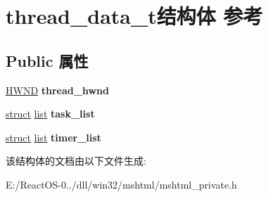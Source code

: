 \hypertarget{structthread__data__t}{}\section{thread\+\_\+data\+\_\+t结构体 参考}
\label{structthread__data__t}
\subsection*{Public 属性}
\begin{DoxyCompactItemize}
\item 
\mbox{\label{structthread__data__t_a055c97e25c6f1cf0102b4a10c71a012f}} 
\hyperlink{interfacevoid}{H\+W\+ND} {\bfseries thread\+\_\+hwnd}
\item 
\mbox{\label{structthread__data__t_ac19fb06e20d26edf71035816d369410c}} 
\hyperlink{interfacestruct}{struct} \hyperlink{classlist}{list} {\bfseries task\+\_\+list}
\item 
\mbox{\label{structthread__data__t_abb650bd0af69056e22714be218bde8ec}} 
\hyperlink{interfacestruct}{struct} \hyperlink{classlist}{list} {\bfseries timer\+\_\+list}
\end{DoxyCompactItemize}


该结构体的文档由以下文件生成\+:\begin{DoxyCompactItemize}
\item 
E\+:/\+React\+O\+S-\/0../dll/win32/mshtml/mshtml\+\_\+private.\+h\end{DoxyCompactItemize}
